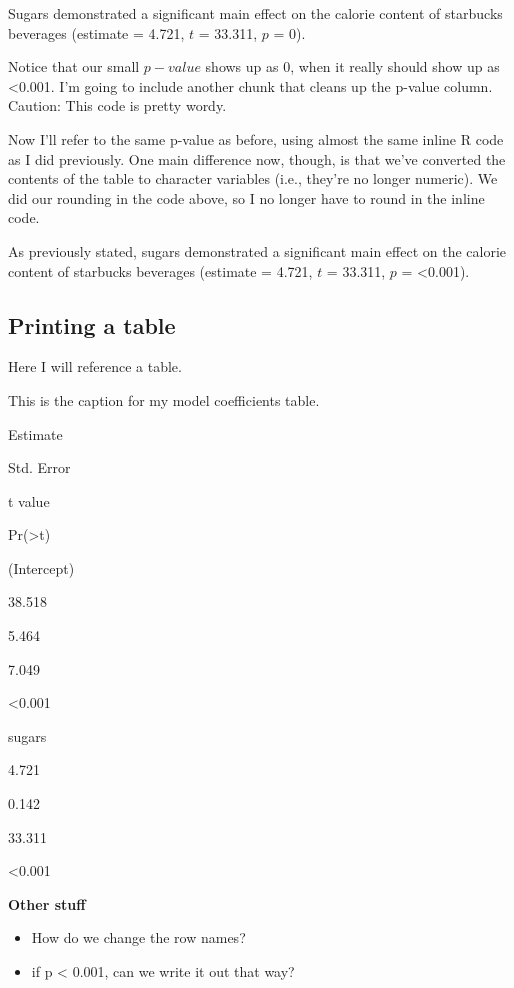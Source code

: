 \documentclass[
  12pt,
  oneside]{book}
\providecommand{\tightlist}{%
  \setlength{\itemsep}{0pt}\setlength{\parskip}{0pt}}
\numberwithin{figure}{chapter}
\begin{document}
Sugars demonstrated a significant main effect on the calorie content of starbucks beverages
(estimate = 4.721,
\(t\) = 33.311,
\(p\) = 0).

Notice that our small \(p-value\) shows up as 0, when it really should show up as \textless0.001. I'm going to include another chunk that cleans up the p-value column. Caution: This code is pretty wordy.

Now I'll refer to the same p-value as before, using almost the same inline R code as I did previously. One main difference now, though, is that we've converted the contents of the table to character variables (i.e., they're no longer numeric). We did our rounding in the code above, so I no longer have to round in the inline code.

As previously stated, sugars demonstrated a significant main effect on the calorie content of starbucks beverages
(estimate = 4.721,
\(t\) = 33.311,
\(p\) = \textless0.001).

\hypertarget{printing-a-table}{%
\subsection{Printing a table}\label{printing-a-table}}

Here I will reference a table.

\label{tab:mod1Coefs}This is the caption for my model coefficients table.

Estimate

Std. Error

t value

Pr(\textgreater\textbar t\textbar)

(Intercept)

38.518

5.464

7.049

\textless0.001

sugars

4.721

0.142

33.311

\textless0.001

\textbf{Other stuff}

\begin{itemize}
\tightlist
\item
  How do we change the row names?
\item
  if p \textless{} 0.001, can we write it out that way?
\end{itemize}
\end{document}
